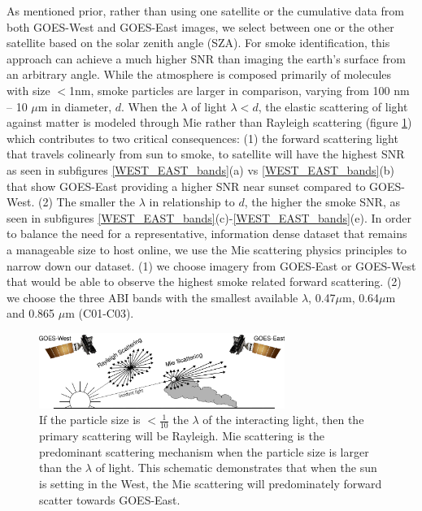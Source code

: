 \documentclass{article}
\begin{document}
As mentioned prior, rather than using one satellite or the cumulative data from both GOES-West and GOES-East images, we select between one or the other satellite based on the solar zenith angle (SZA). For smoke identification, this approach can achieve a much higher SNR than imaging the earth’s surface from an arbitrary angle. While the atmosphere is composed primarily of molecules with size \(<\)1nm, smoke particles are larger in comparison, varying from 100 nm -- 10 \(\mu\)m in diameter, \(d\). When the \(\lambda\) of light \(\lambda<d\), the elastic scattering of light against matter is modeled through Mie rather than Rayleigh scattering (figure \ref{mei}) which contributes to two critical consequences: (1) the forward scattering light that travels colinearly from sun to smoke, to satellite will have the highest SNR as seen in subfigures \ref{WEST_EAST_bands}(a) vs \ref{WEST_EAST_bands}(b) that show GOES-East providing a higher SNR near sunset compared to GOES-West. (2) The smaller the \(\lambda\) in relationship to \(d\), the higher the smoke SNR, as seen in subfigures \ref{WEST_EAST_bands}(c)-\ref{WEST_EAST_bands}(e). In order to balance the need for a representative, information dense dataset that remains a manageable size to host online, we use the Mie scattering physics principles to narrow down our dataset. (1) we choose imagery from GOES-East or GOES-West that would be able to observe the highest smoke related forward scattering. (2) we choose the three ABI bands with the smallest available \(\lambda\), 0.47\(\mu\)m, 0.64\(\mu\)m and 0.865 \(\mu\)m (C01-C03). 


\begin{figure}[!htb]
    \centering
    \includegraphics[width=8cm]{figures/mei.png}
    \caption{If the particle size is \(<\frac{1}{10}\) the \(\lambda\) of the interacting light, then the primary scattering will be Rayleigh. Mie scattering is the predominant scattering mechanism when the particle size is larger than the \(\lambda\) of light. This schematic demonstrates that when the sun is setting in the West, the Mie scattering will predominately forward scatter towards GOES-East.} \label{mei}
\end{figure}
\end{document}
